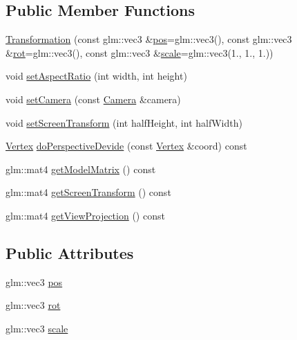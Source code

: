 \subsection*{Public Member Functions}
\begin{DoxyCompactItemize}
\item 
\hyperlink{class_transformation_a9e066efd2a4d28a13d1bdb54de254bec}{Transformation} (const glm\+::vec3 \&\hyperlink{class_transformation_aeaf15f9849ac1a0dc2b5f7a7da12e0ed}{pos}=glm\+::vec3(), const glm\+::vec3 \&\hyperlink{class_transformation_a4d41188f5f002453bb288c32452c79d2}{rot}=glm\+::vec3(), const glm\+::vec3 \&\hyperlink{class_transformation_abaca94f82d6d4c1515c133e638624724}{scale}=glm\+::vec3(1., 1., 1.))
\item 
void \hyperlink{class_transformation_aba67dba23c6180e047f8172c461a7554}{set\+Aspect\+Ratio} (int width, int height)
\item 
void \hyperlink{class_transformation_a93295202dbfbb2b450d5bd893ee3237b}{set\+Camera} (const \hyperlink{class_camera}{Camera} \&camera)
\item 
void \hyperlink{class_transformation_ae2dcb616a0231a331ed97a9ef5704849}{set\+Screen\+Transform} (int half\+Height, int half\+Width)
\item 
\hyperlink{struct_vertex}{Vertex} \hyperlink{class_transformation_a9bb89f79245297795c78f62ca6b29efd}{do\+Perspective\+Devide} (const \hyperlink{struct_vertex}{Vertex} \&coord) const 
\item 
glm\+::mat4 \hyperlink{class_transformation_a0a6033abab9c32b487c90b95fd1a2df3}{get\+Model\+Matrix} () const 
\item 
glm\+::mat4 \hyperlink{class_transformation_a4d2b0cd9862c2b0485740a896617c867}{get\+Screen\+Transform} () const 
\item 
glm\+::mat4 \hyperlink{class_transformation_a5f57370067951aecad8b40bec887c2ef}{get\+View\+Projection} () const 
\end{DoxyCompactItemize}
\subsection*{Public Attributes}
\begin{DoxyCompactItemize}
\item 
glm\+::vec3 \hyperlink{class_transformation_aeaf15f9849ac1a0dc2b5f7a7da12e0ed}{pos}
\item 
glm\+::vec3 \hyperlink{class_transformation_a4d41188f5f002453bb288c32452c79d2}{rot}
\item 
glm\+::vec3 \hyperlink{class_transformation_abaca94f82d6d4c1515c133e638624724}{scale}
\end{DoxyCompactItemize}


